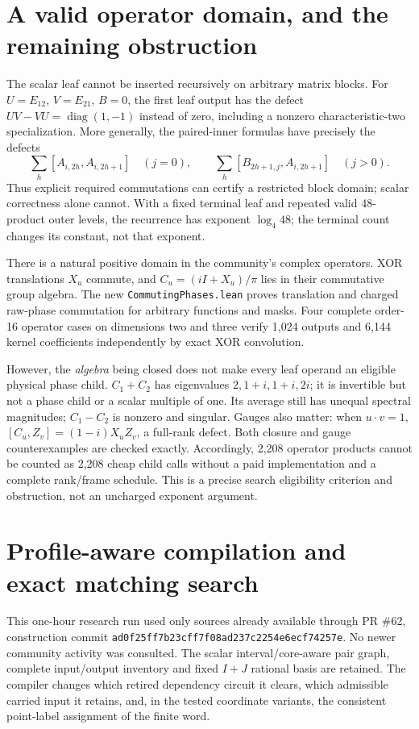 \documentclass[11pt]{article}
\newcommand{\pii}{\pi}
\begin{document}
\section{A valid operator domain, and the remaining obstruction}
The scalar leaf cannot be inserted recursively on arbitrary matrix blocks.
For $U=E_{12}$, $V=E_{21}$, $B=0$, the first leaf output has the defect
$UV-VU=\operatorname{diag}(1,-1)$ instead of zero, including a nonzero
characteristic-two specialization. More generally, the paired-inner
formulas have precisely the defects
\[
 \sum_h[A_{i,2h},A_{i,2h+1}]
 \quad(j=0),\qquad
 \sum_h[B_{2h+1,j},A_{i,2h+1}]\quad(j>0).
\]
Thus explicit required commutations can certify a restricted block domain;
scalar correctness alone cannot. With a fixed terminal leaf and repeated
valid 48-product outer levels, the recurrence has exponent $\log_4 48$;
the terminal count changes its constant, not that exponent.

There is a natural positive domain in the community's complex operators.
XOR translations $X_u$ commute, and
$C_u=(iI+X_u)/\pii$ lies in their commutative group algebra. The new
\texttt{CommutingPhases.lean} proves translation and charged raw-phase
commutation for arbitrary functions and masks. Four complete order-16
operator cases on dimensions two and three verify 1,024 outputs and 6,144
kernel coefficients independently by exact XOR convolution.

However, the \emph{algebra} being closed does not make every leaf operand
an eligible physical phase child. $C_1+C_2$ has eigenvalues
$2,1+i,1+i,2i$; it is invertible but not a phase child or a scalar multiple
of one. Its average still has unequal spectral magnitudes; $C_1-C_2$ is
nonzero and singular. Gauges also matter:
when $u\cdot v=1$,
$[C_u,Z_v]=(1-i)X_uZ_v$, a full-rank defect. Both closure and gauge
counterexamples are checked exactly. Accordingly, 2,208 operator products
cannot be counted as 2,208 cheap child calls without a paid implementation
and a complete rank/frame schedule. This is a precise search eligibility
criterion and obstruction, not an uncharged exponent argument.

\section{Profile-aware compilation and exact matching search}
This one-hour research run used only sources already available through PR
\#62, construction commit
\texttt{ad0f25ff7b23cff7f08ad237c2254e6ecf74257e}. No newer community
activity was consulted. The scalar interval/core-aware pair graph, complete
input/output inventory and fixed $I+J$ rational basis are retained. The compiler
changes which retired dependency circuit it clears, which admissible carried
input it retains, and, in the tested coordinate variants, the consistent
point-label assignment of the finite word.
\end{document}

